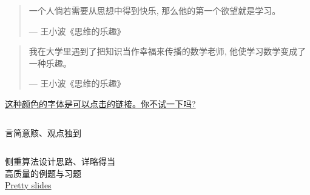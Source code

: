 \begin{frame}{}
  \centerline{\Large {}}
  \begin{quote}
    一个人倘若需要从思想中得到快乐, 那么他的第一个欲望就是学习。

    \hfill --- 王小波《思维的乐趣》
  \end{quote}
\end{frame}

\begin{frame}{}
  \centerline{\Large {}}
  \begin{quote}
    我在大学里遇到了把知识当作幸福来传播的数学老师, 他使学习数学变成了一种乐趣。

    \hfill --- 王小波《思维的乐趣》
  \end{quote}
\end{frame}

\begin{frame}{}
  \centerline{\href{}{这种颜色的字体是可以点击的链接。你不试一下吗?}}
\end{frame}



\begin{frame}{}
  \begin{columns}
  \end{columns}

  \vspace{0.80cm}
  \centerline{言简意赅、观点独到}
\end{frame}

\begin{frame}{}
  \begin{columns}
  \end{columns}

  \vspace{0.10cm}
  \begin{center}
    侧重算法设计思路、详略得当 \\[6pt]
    高质量的例题与习题 \\[10pt]

    \href{http://www.cs.princeton.edu/~wayne/kleinberg-tardos/}{Pretty slides}
  \end{center}
\end{frame}

